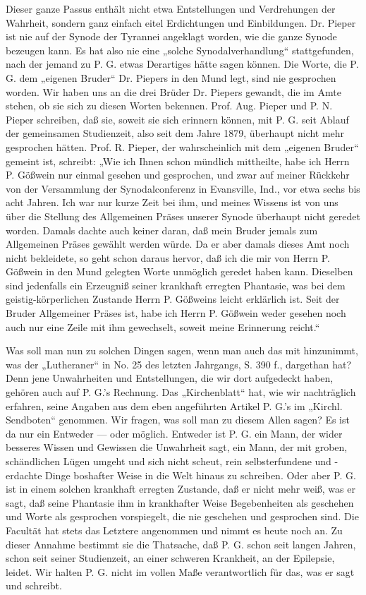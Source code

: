 Dieser ganze Passus enthält nicht etwa Entstellungen und Verdrehungen der Wahrheit, sondern ganz einfach eitel Erdichtungen und Einbildungen. Dr. Pieper ist nie auf der Synode der Tyrannei angeklagt worden, wie die ganze Synode bezeugen kann. Es hat also nie eine „solche Synodalverhandlung“ stattgefunden, nach der jemand zu P. G. etwas Derartiges hätte sagen können. Die Worte, die P. G. dem „eigenen Bruder“ Dr. Piepers in den Mund legt, sind nie gesprochen worden. Wir haben uns an die drei Brüder Dr. Piepers gewandt, die im Amte stehen, ob sie sich zu diesen Worten bekennen. Prof. Aug. Pieper und P. N. Pieper schreiben, daß sie, soweit sie sich erinnern können, mit P. G. seit Ablauf der gemeinsamen Studienzeit, also seit dem Jahre 1879, überhaupt nicht mehr gesprochen hätten. Prof. R. Pieper, der wahrscheinlich mit dem „eigenen Bruder“ gemeint ist, schreibt: „Wie ich Ihnen schon mündlich mittheilte, habe ich Herrn P. Gößwein nur einmal gesehen und gesprochen, und zwar auf meiner Rückkehr von der Versammlung der Synodalconferenz in Evansville, Ind., vor etwa sechs bis acht Jahren. Ich war nur kurze Zeit bei ihm, und meines Wissens ist von uns über die Stellung des Allgemeinen Präses unserer Synode überhaupt nicht geredet worden. Damals dachte auch keiner daran, daß mein Bruder jemals zum Allgemeinen Präses gewählt werden würde. Da er aber damals dieses Amt noch nicht bekleidete, so geht schon daraus hervor, daß ich die mir von Herrn P. Gößwein in den Mund gelegten Worte unmöglich geredet haben kann. Dieselben sind jedenfalls ein Erzeugniß seiner krankhaft erregten Phantasie, was bei dem geistig-körperlichen Zustande Herrn P. Gößweins leicht erklärlich ist. Seit der Bruder Allgemeiner Präses ist, habe ich Herrn P. Gößwein weder gesehen noch auch nur eine Zeile mit ihm gewechselt, soweit meine Erinnerung reicht.“

Was soll man nun zu solchen Dingen sagen, wenn man auch das mit hinzunimmt, was der „Lutheraner“ in No. 25 des letzten Jahrgangs, S. 390 f., dargethan hat? Denn jene Unwahrheiten und Entstellungen, die wir dort aufgedeckt haben, gehören auch auf P. G.’s Rechnung. Das „Kirchenblatt“ hat, wie wir nachträglich erfahren, seine Angaben aus dem eben angeführten Artikel P. G.’s im „Kirchl. Sendboten“ genommen. Wir fragen, was soll man zu diesem Allen sagen? Es ist da nur ein Entweder — oder möglich. Entweder ist P. G. ein Mann, der wider besseres Wissen und Gewissen die Unwahrheit sagt, ein Mann, der mit groben, schändlichen Lügen umgeht und sich nicht scheut, rein selbsterfundene und -erdachte Dinge boshafter Weise in die Welt hinaus zu schreiben. Oder aber P. G. ist in einem solchen krankhaft erregten Zustande, daß er nicht mehr weiß, was er sagt, daß seine Phantasie ihm in krankhafter Weise Begebenheiten als geschehen und Worte als gesprochen vorspiegelt, die nie geschehen und gesprochen sind. Die Facultät hat stets das Letztere angenommen und nimmt es heute noch an. Zu dieser Annahme bestimmt sie die Thatsache, daß P. G. schon seit langen Jahren, schon seit seiner Studienzeit, an einer schweren Krankheit, an der Epilepsie, leidet. Wir halten P. G. nicht im vollen Maße verantwortlich für das, was er sagt und schreibt.

